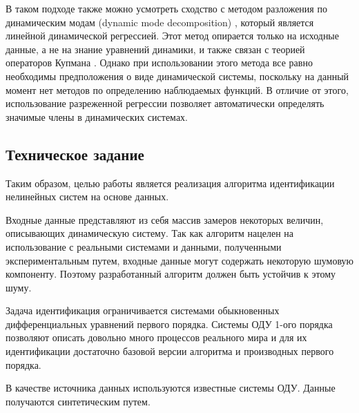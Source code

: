 В таком подходе также можно усмотреть сходство с методом разложения по динамическим модам (dynamic mode decomposition) \cite{dmd}, который является линейной динамической регрессией. Этот метод опирается только на исходные данные, а не на знание уравнений динамики, и также связан с теорией операторов Купмана \cite{koopman}. Однако при использовании этого метода все равно необходимы предположения о виде динамической системы, поскольку на данный момент нет методов по определению наблюдаемых функций. В отличие от этого, использование разреженной регрессии позволяет автоматически определять значимые члены в динамических системах.

\subsection{Техническое задание}

Таким образом, целью работы является реализация алгоритма идентификации нелинейных систем на основе данных.

Входные данные представляют из себя массив замеров некоторых величин, описывающих динамическую систему. Так как алгоритм нацелен на использование с реальными системами и данными, полученными экспериментальным путем, входные данные могут содержать некоторую шумовую компоненту. Поэтому разработанный алгоритм должен быть устойчив к этому шуму.

Задача идентификация ограничивается системами обыкновенных дифференциальных уравнений первого порядка. Системы ОДУ 1-ого порядка позволяют описать довольно много процессов реального мира и для их идентификации достаточно базовой версии алгоритма и производных первого порядка.

В качестве источника данных используются известные системы ОДУ. Данные получаются синтетическим путем.
